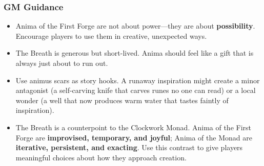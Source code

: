 \subsubsection*{GM Guidance}
\begin{itemize}
  \item Anima of the First Forge are not about power---they are about \textbf{possibility}. Encourage players to use them in creative, unexpected ways.
  \item The Breath is generous but short-lived. Anima should feel like a gift that is always just about to run out.
  \item Use animus scars as story hooks. A runaway inspiration might create a minor antagonist (a self-carving knife that carves runes no one can read) or a local wonder (a well that now produces warm water that tastes faintly of inspiration).
  \item The Breath is a counterpoint to the Clockwork Monad. Anima of the First Forge are \textbf{improvised, temporary, and joyful}; Anima of the Monad are \textbf{iterative, persistent, and exacting}. Use this contrast to give players meaningful choices about how they approach creation.
\end{itemize}


